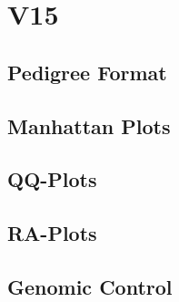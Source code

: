 \section{V15}
\subsection{Pedigree Format}

\subsection{Manhattan Plots}

\subsection{QQ-Plots}

\subsection{RA-Plots}

\subsection{Genomic Control}